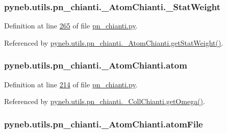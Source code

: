 \subsubsection[{\+\_\+\+Stat\+Weight}]{\setlength{\rightskip}{0pt plus 5cm}pyneb.\+utils.\+pn\+\_\+chianti.\+\_\+\+Atom\+Chianti.\+\_\+\+Stat\+Weight\hspace{0.3cm}{\ttfamily [private]}}\label{classpyneb_1_1utils_1_1pn__chianti_1_1___atom_chianti_a8a718be321d05e4212ff5be195c92b42}


Definition at line \hyperlink{pn__chianti_8py_source_l00265}{265} of file \hyperlink{pn__chianti_8py_source}{pn\+\_\+chianti.\+py}.



Referenced by \hyperlink{pn__chianti_8py_source_l00323}{pyneb.\+utils.\+pn\+\_\+chianti.\+\_\+\+Atom\+Chianti.\+get\+Stat\+Weight()}.

\hypertarget{classpyneb_1_1utils_1_1pn__chianti_1_1___atom_chianti_a168acbb7ea238fb41299616a512d487c}{}
\subsubsection[{atom}]{\setlength{\rightskip}{0pt plus 5cm}pyneb.\+utils.\+pn\+\_\+chianti.\+\_\+\+Atom\+Chianti.\+atom}\label{classpyneb_1_1utils_1_1pn__chianti_1_1___atom_chianti_a168acbb7ea238fb41299616a512d487c}


Definition at line \hyperlink{pn__chianti_8py_source_l00214}{214} of file \hyperlink{pn__chianti_8py_source}{pn\+\_\+chianti.\+py}.



Referenced by \hyperlink{pn__chianti_8py_source_l00484}{pyneb.\+utils.\+pn\+\_\+chianti.\+\_\+\+Coll\+Chianti.\+get\+Omega()}.

\hypertarget{classpyneb_1_1utils_1_1pn__chianti_1_1___atom_chianti_acf53db82cf11ffa5218615522a69dff2}{}
\subsubsection[{atom\+File}]{\setlength{\rightskip}{0pt plus 5cm}pyneb.\+utils.\+pn\+\_\+chianti.\+\_\+\+Atom\+Chianti.\+atom\+File}\label{classpyneb_1_1utils_1_1pn__chianti_1_1___atom_chianti_acf53db82cf11ffa5218615522a69dff2}


